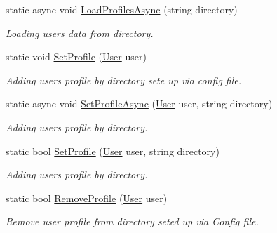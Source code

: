 \begin{DoxyCompactItemize}
\item 
static async void \mbox{\hyperlink{class_authority_controller_1_1_a_p_i_1_1_local_users_a1c037e720aa8b718fa5ceec4d2495f41}{Load\+Profiles\+Async}} (string directory)
\begin{DoxyCompactList}\small\item\em Loading users data from directory. \end{DoxyCompactList}\item 
static void \mbox{\hyperlink{class_authority_controller_1_1_a_p_i_1_1_local_users_ac9295cdceab3bc5a0363a435cbdf3f03}{Set\+Profile}} (\mbox{\hyperlink{class_authority_controller_1_1_data_1_1_personal_1_1_user}{User}} user)
\begin{DoxyCompactList}\small\item\em Adding user\textquotesingle{}s profile by directory sete up via config file. \end{DoxyCompactList}\item 
static async void \mbox{\hyperlink{class_authority_controller_1_1_a_p_i_1_1_local_users_a87fd101098bce03f6c0775434946640e}{Set\+Profile\+Async}} (\mbox{\hyperlink{class_authority_controller_1_1_data_1_1_personal_1_1_user}{User}} user, string directory)
\begin{DoxyCompactList}\small\item\em Adding user\textquotesingle{}s profile by directory. \end{DoxyCompactList}\item 
static bool \mbox{\hyperlink{class_authority_controller_1_1_a_p_i_1_1_local_users_af2f5f3adeecfe6de4d7e480dfc22157a}{Set\+Profile}} (\mbox{\hyperlink{class_authority_controller_1_1_data_1_1_personal_1_1_user}{User}} user, string directory)
\begin{DoxyCompactList}\small\item\em Adding user\textquotesingle{}s profile by directory. \end{DoxyCompactList}\item 
static bool \mbox{\hyperlink{class_authority_controller_1_1_a_p_i_1_1_local_users_a11f2205f650c36ae8bce9b291a6f1cba}{Remove\+Profile}} (\mbox{\hyperlink{class_authority_controller_1_1_data_1_1_personal_1_1_user}{User}} user)
\begin{DoxyCompactList}\small\item\em Remove user profile from directory seted up via Config file. \end{DoxyCompactList}\item 

\end{DoxyCompactItemize}
